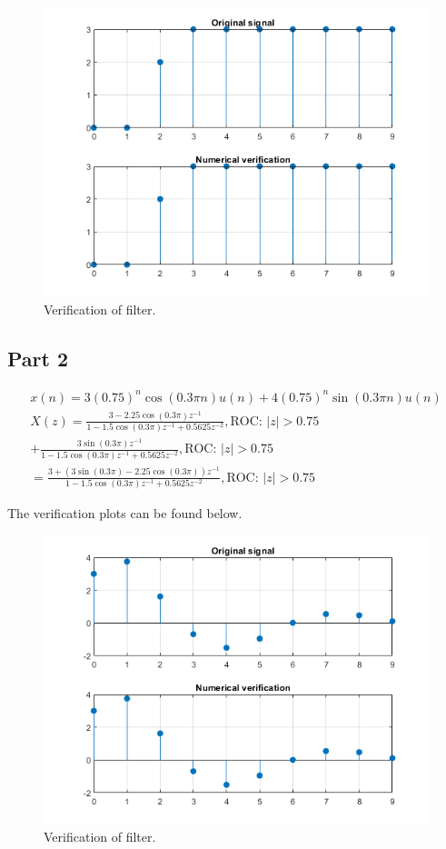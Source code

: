\documentclass{article}
\begin{document}
\begin{figure}[H]
    \centering
    \includegraphics[width=\textwidth]{"Images/4-3 Fig1"}
    \caption{Verification of filter.}
    \label{plot:4.3.1}
\end{figure}

\subsection*{Part 2}
\begin{gather*}
    x(n) = 3(0.75)^n \cos(0.3\pi n) u(n) + 4(0.75)^n\sin(0.3\pi n)u(n)\\
    X(z) = \frac{3 - 2.25\cos(0.3\pi)z^{-1}}{1 - 1.5\cos(0.3\pi)z^{-1} + 0.5625z^{-2}}, \text{ROC: } |z| > 0.75\\
    + \frac{3\sin(0.3\pi)z^{-1}}{1 - 1.5\cos(0.3\pi)z^{-1} + 0.5625z^{-2}}, \text{ROC: } |z| > 0.75\\
    = \frac{3 + (3\sin(0.3\pi)-2.25\cos(0.3\pi))z^{-1}}{1 - 1.5\cos(0.3\pi)z^{-1} + 0.5625z^{-2}}, \text{ROC: } |z| > 0.75
\end{gather*}

The verification plots can be found below.

\begin{figure}[H]
    \centering
    \includegraphics[width=\textwidth]{"Images/4-3 Fig2"}
    \caption{Verification of filter.}
    \label{plot:4.3.2}
\end{figure}
\end{document}

